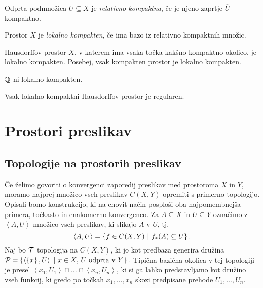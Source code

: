 \begin{definicija}
    Odprta podmnožica $U \subseteq X$ je \emph{relativno kompaktna}, če je njeno zaprtje \(\overline{U}\) kompaktno.
\end{definicija}

\begin{definicija}
    Prostor $X$ je \emph{lokalno kompakten}, če ima bazo iz relativno kompaktnih množic.
\end{definicija}

\begin{izrek}
    Hausdorffov prostor $X$, v katerem ima vsaka točka kakšno kompaktno okolico, je lokalno kompakten. Posebej, vsak kompakten prostor je lokalno kompakten.
\end{izrek}

\begin{primer}
    \(\mathbb{Q}\) ni lokalno kompakten.
\end{primer}

\begin{izrek}
    Vsak lokalno kompaktni Hausdorffov prostor je regularen.
\end{izrek}

\section{Prostori preslikav}

\subsection{Topologije na prostorih preslikav}
Če želimo govoriti o konvergenci zaporedij preslikav med prostoroma $X$ in $Y$, moramo najprej množico vseh preslikav \(C(X, Y)\) opremiti s primerno topologijo. Opisali bomo konstrukcijo, ki na enovit način posploši oba najpomembnejša primera, točkasto in enakomerno konvergenco. Za \(A \subseteq X\) in \(U \subseteq Y\) označimo z $\left\langle A, U\right\rangle$ množico vseh preslikav, ki slikajo $A$ v $U$, tj. 
$$\left\langle A, U \right\rangle = \left\{f \in C(X,Y) \ | \ f_{*}(A) \subseteq U\right\}.$$
Naj bo $\mathcal{T}$ topologija na $C(X, Y)$, ki jo kot predbaza generira družina \(\mathcal{P} = \left\{\left\langle \left\{x\right\}, U \right\rangle \ | \ x \in X, \, U \text{ odprta v } Y\right\}.\) Tipična bazična okolica v tej topologiji je presel $\left\langle x_1, U_1 \right\rangle \cap \ldots \cap \left\langle x_n, U_n \right\rangle$, ki si ga lahko predstavljamo kot družino vseh funkcij, ki gredo po točkah $x_1, \ldots, x_n$ skozi predpisane prehode $U_1, \ldots, U_n$.

